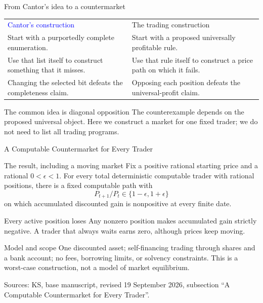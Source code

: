 \documentclass{beamer}
\newcommand{\sourcefoot}[1]{%
  \par\vfill{\fontsize{6.3}{7.5}\selectfont\color{black!65}Sources: #1\par}}
\begin{document}
\begin{frame}{From Cantor's idea to a countermarket}
\small

\begin{tabular}{@{}
  >{\raggedright\arraybackslash}p{}
  @{\hspace{0.03\textwidth}}
  >{\raggedright\arraybackslash}p{}
  @{}}
\textcolor{blue}{Cantor's construction}
&
\textcolor{green!50!black}{The trading construction}
\\[0.8em]

\rowcolor{black!15}
Start with a purportedly complete enumeration.
&
Start with a proposed universally profitable rule.
\\[1em]


Use that list itself to construct something that it misses.
&
Use that rule itself to construct a price path on which it fails.
\\[1em]

\rowcolor{black!15}
Changing the selected bit defeats the completeness claim.
&
Opposing each position defeats the universal-profit claim.
\end{tabular}

\medskip
\begin{alertblock}{The common idea is diagonal opposition}
The counterexample depends on the proposed universal object.
Here we construct a market for one fixed trader; we do not need to list
all trading programs.
\end{alertblock}
\end{frame}

\begin{frame}{A Computable Countermarket for Every Trader}
\small
\begin{block}{The result, including a moving market}
Fix a positive rational starting price and a rational $0<\epsilon<1$.
For every total deterministic computable trader with rational positions,
there is a fixed computable path with
\[
  P_{t+1}/P_t\in\{1-\epsilon,1+\epsilon\}
\]
on which accumulated discounted gain is nonpositive at every finite date.
\end{block}
\begin{exampleblock}{Every active position loses}
Any nonzero position makes accumulated gain strictly negative.
A trader that always waits earns zero, although prices keep moving.
\end{exampleblock}
\begin{alertblock}{Model and scope}
One discounted asset; self-financing trading through shares and a bank
account; no fees, borrowing limits, or solvency constraints.
This is a worst-case construction, not a model of market equilibrium.
\end{alertblock}
\sourcefoot{KS, base manuscript, revised 19 September 2026,
subsection \enquote{A Computable Countermarket for Every Trader}.}
\end{frame}
\end{document}
